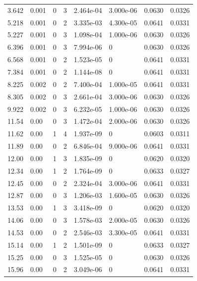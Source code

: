 \documentclass[preview]{standalone}
\begin{document}
{{\begin{tabular}{L{1.2cm}C{1.2cm} C{0.3cm}C{0.5cm} C{1.4cm}C{1.4cm} C{1.4cm}C{1.4cm}}
  3.642  &  0.001  & 0     &  3 &  2.464e-04  & 3.000e-06  & 0.0630 &  0.0326   \\ 
  5.218  &  0.001  & 0     &  2 &  3.335e-03  & 4.300e-05  & 0.0641 &  0.0331   \\ 
  5.227  &  0.001  & 0     &  3 &  1.098e-04  & 1.000e-06  & 0.0630 &  0.0326   \\ 
  6.396  &  0.001  & 0     &  3 &  7.994e-06  & 0  & 0.0630 &  0.0326   \\ 
  6.568  &  0.001  & 0     &  2 &  1.523e-05  & 0  & 0.0641 &  0.0331   \\ 
  7.384  &  0.001  & 0     &  2 &  1.144e-08  & 0  & 0.0641 &  0.0331   \\ 
  8.225  &  0.002  & 0     &  2 &  7.400e-04  & 1.000e-05  & 0.0641 &  0.0331   \\ 
  8.305  &  0.002  & 0     &  3 &  2.661e-04  & 3.000e-06  & 0.0630 &  0.0326   \\ 
  9.922  &  0.002  & 0     &  3 &  6.232e-05  & 1.000e-06  & 0.0630 &  0.0326   \\ 
  11.54  &  0.00  & 0     &  3 &  1.472e-04  & 2.000e-06  & 0.0630 &  0.0326   \\ 
  11.62  &  0.00  & 1     &  4 &  1.937e-09  & 0  & 0.0603 &  0.0311   \\ 
  11.89  &  0.00  & 0     &  2 &  6.846e-04  & 9.000e-06  & 0.0641 &  0.0331   \\ 
  12.00  &  0.00  & 1     &  3 &  1.835e-09  & 0  & 0.0620 &  0.0320   \\ 
  12.34  &  0.00  & 1     &  2 &  1.764e-09  & 0  & 0.0633 &  0.0327   \\ 
  12.45  &  0.00  & 0     &  2 &  2.324e-04  & 3.000e-06  & 0.0641 &  0.0331   \\ 
  12.87  &  0.00  & 0     &  3 &  1.206e-03  & 1.600e-05  & 0.0630 &  0.0326   \\ 
  13.53  &  0.00  & 1     &  3 &  3.418e-09  & 0  & 0.0620 &  0.0320   \\ 
  14.06  &  0.00  & 0     &  3 &  1.578e-03  & 2.000e-05  & 0.0630 &  0.0326   \\ 
  14.53  &  0.00  & 0     &  2 &  2.546e-03  & 3.300e-05  & 0.0641 &  0.0331   \\ 
  15.14  &  0.00  & 1     &  2 &  1.501e-09  & 0  & 0.0633 &  0.0327   \\ 
  15.25  &  0.00  & 0     &  3 &  1.525e-05  & 0  & 0.0630 &  0.0326   \\ 
  15.96  &  0.00  & 0     &  2 &  3.049e-06  & 0  & 0.0641 &  0.0331   \\ 

\end{tabular}}}
\end{document}
